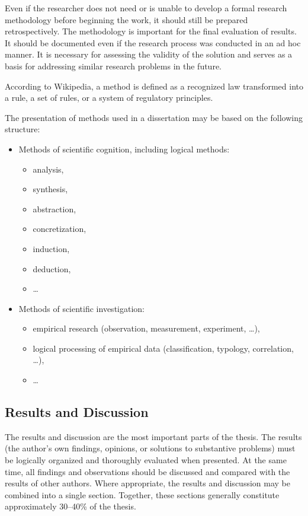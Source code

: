 Even if the researcher does not need or is unable to develop a formal research methodology before beginning the work, it should still be prepared retrospectively. The methodology is important for the final evaluation of results. It should be documented even if the research process was conducted in an ad hoc manner. It is necessary for assessing the validity of the solution and serves as a basis for addressing similar research problems in the future. 

According to Wikipedia, a method is defined as a recognized law transformed into a rule, a set of rules, or a system of regulatory principles. 

The presentation of methods used in a dissertation may be based on the following structure: 

\begin{itemize} 
	\item Methods of scientific cognition, including logical methods: 
	\begin{itemize} 
		\item analysis, 
		\item synthesis, 
		\item abstraction, 
		\item concretization, 
		\item induction, 
		\item deduction, 
		\item \dots 
	\end{itemize} 
		
	\item Methods of scientific investigation: 
	\begin{itemize} 
		\item empirical research (observation, measurement, experiment, \dots), 
		\item logical processing of empirical data (classification, typology, correlation, \dots), 
		\item \dots 
	\end{itemize} 
\end{itemize} 

\subsection{Results and Discussion}

The results and discussion are the most important parts of the thesis. The results (the author's own findings, opinions, or solutions to substantive problems) must be logically organized and thoroughly evaluated when presented. At the same time, all findings and observations should be discussed and compared with the results of other authors. Where appropriate, the results and discussion may be combined into a single section. Together, these sections generally constitute approximately 30--40\% of the thesis.

